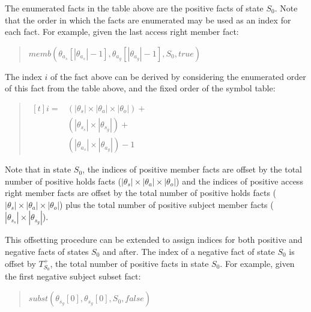 \documentclass[10pt, twocolumn]{article}
\begin{document}
          The enumerated facts in the table above are the positive facts of
          state $S_{0}$. Note that the order in which the facts are enumerated
          may be used as an index for each fact. For example, given the last
          access right member fact:

          \begin{quote}
            $memb({\theta}_{a_s}[|{\theta}_{a_s}| - 1], {\theta}_{a_g}[|{\theta}_{a_g}| - 1], S_{0}, true)$
          \end{quote}

          The index $i$ of the fact above can be derived by considering the
          enumerated order of this fact from the table above, and the fixed
          order of the symbol table:

          \begin{quote}
            \begin{math}
              \begin{aligned}[t]
                i =& (|{\theta}_{s}| \times |{\theta}_{a}| \times |{\theta}_{o}|) + \\
                & (|{\theta}_{s_s}| \times |{\theta}_{s_g}|) + \\
                & (|{\theta}_{a_s}| \times |{\theta}_{a_g}|) - 1
              \end{aligned}
            \end{math}
          \end{quote}

          Note that in state $S_{0}$, the indices of positive member facts are
          offset by the total number of positive holds facts
          ($|{\theta}_{s}| \times |{\theta}_{a}| \times |{\theta}_{o}|$) and
          the indices of positive access right member facts are offset by the
          total number of positive holds facts ($|{\theta}_{s}| \times
          |{\theta}_{a}| \times |{\theta}_{o}|$) plus the total number of
          positive subject member facts ($|{\theta}_{s_s}| \times
          |{\theta}_{s_g}|$).

          This offsetting procedure can be extended to assign indices for both
          positive and negative facts of states $S_{0}$ and after. The index of
          a negative fact of state $S_{0}$ is offset by $T^{+}_{S_{0}}$, the
          total number of positive facts in state $S_{0}$. For example, given
          the first negative subject subset fact:

          \begin{quote}
            $subst({\theta}_{s_g}[0], {\theta}_{s_g}[0], S_{0}, false)$
          \end{quote}
\end{document}
